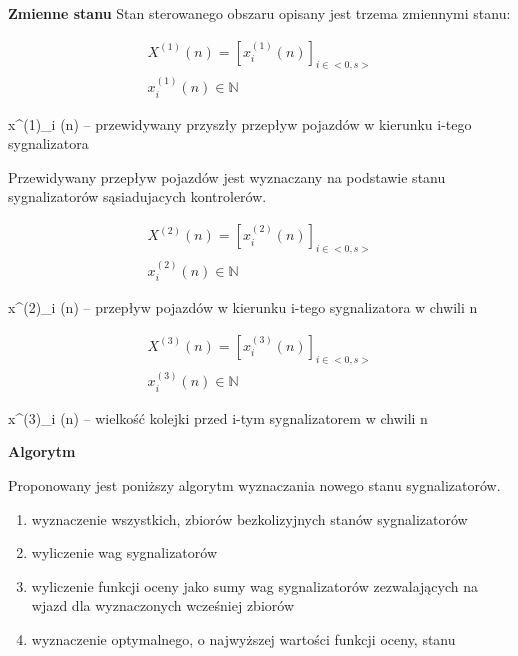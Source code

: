 \vspace{1.5cm}
\textbf{Zmienne stanu}
Stan sterowanego obszaru opisany jest trzema zmiennymi stanu:
\vspace{0.5cm}

\begin{equation}
	\begin{array}{c}
		X^{(1)} (n) = \left[ x^{(1)}_{i} (n) \right]_{i \in <0,s>}\\
		x^{(1)}_{i} (n) \in \mathbb{N}
	\end{array}
\end{equation}

x^{(1)}_{i} (n) \textrm{ -- przewidywany przyszły przepływ pojazdów w kierunku i-tego sygnalizatora}

Przewidywany przepływ pojazdów jest wyznaczany na podstawie stanu sygnalizatorów sąsiadujacych kontrolerów.

\begin{equation}
	\begin{array}{c}
		X^{(2)} (n) = \left[ x^{(2)}_{i} (n) \right]_{i \in <0,s>}\\
		x^{(2)}_{i} (n) \in \mathbb{N}
	\end{array}
\end{equation}

x^{(2)}_{i} (n) \textrm{ -- przepływ pojazdów w kierunku i-tego sygnalizatora w chwili n}

\begin{equation}
	\begin{array}{c}
		X^{(3)} (n) = \left[ x^{(3)}_{i} (n) \right]_{i \in <0,s>}\\
		x^{(3)}_{i} (n) \in \mathbb{N}
	\end{array}
\end{equation}

x^{(3)}_{i} (n) \textrm{ -- wielkość kolejki przed i-tym sygnalizatorem w chwili n}

\vspace{1.5cm}
\textbf{Algorytm}

Proponowany jest poniższy algorytm wyznaczania nowego stanu sygnalizatorów.
\begin{enumerate}
	\item wyznaczenie wszystkich, zbiorów bezkolizyjnych stanów sygnalizatorów
	\item wyliczenie wag sygnalizatorów
	\item wyliczenie funkcji oceny jako sumy wag sygnalizatorów zezwalających na wjazd dla wyznaczonych wcześniej zbiorów
	\item wyznaczenie optymalnego, o najwyższej wartości funkcji oceny, stanu
\end{enumerate}

